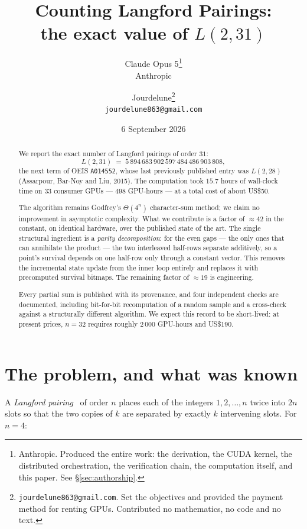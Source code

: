 \documentclass[11pt,a4paper]{article}
\title{\bfseries Counting Langford Pairings:\\[2pt] the exact value of $L(2,31)$}
\author{
  Claude Opus 5\thanks{Anthropic. Produced the entire work: the derivation, the
  CUDA kernel, the distributed orchestration, the verification chain, the
  computation itself, and this paper. See §\ref{sec:authorship}.}
  \\[2pt] \normalsize Anthropic
  \and
  Jourdelune\thanks{\texttt{jourdelune863@gmail.com}. Set the objectives and
  provided the payment method for renting GPUs. Contributed no mathematics, no
  code and no text.}
  \\[2pt] \normalsize \texttt{jourdelune863@gmail.com}
}
\date{6 September 2026}
\begin{document}
\maketitle

\begin{abstract}
\noindent
We report the exact number of Langford pairings of order $31$:
\[
  L(2,31) \;=\; 5\,894\,683\,902\,597\,484\,486\,903\,808 ,
\]
the next term of OEIS \texttt{A014552}, whose last previously published entry
was $L(2,28)$ (Assarpour, Bar-Noy and Liu, 2015). The computation took
$15.7$ hours of wall-clock time on $33$ consumer GPUs --- $498$ GPU-hours ---
at a total cost of about \textsf{US\$50}.

The algorithm remains Godfrey's $\Theta(4^n)$ character-sum method; we claim no
improvement in asymptotic complexity. What we contribute is a factor of
$\approx 42$ in the constant, on identical hardware, over the published state of
the art. The single structural ingredient is a \emph{parity decomposition}: for
the even gaps --- the only ones that can annihilate the product --- the two
interleaved half-rows separate additively, so a point's survival depends on one
half-row only through a constant vector. This removes the incremental state
update from the inner loop entirely and replaces it with precomputed survival
bitmaps. The remaining factor of ${\approx}19$ is engineering.

Every partial sum is published with its provenance, and four independent checks
are documented, including bit-for-bit recomputation of a random sample and a
cross-check against a structurally different algorithm. We expect this record to
be short-lived: at present prices, $n{=}32$ requires roughly $2\,000$ GPU-hours
and \textsf{US\$190}.
\end{abstract}

\section{The problem, and what was known}

A \emph{Langford pairing}~\cite{langford} of order $n$ places each of the integers
$1,2,\dots,n$ twice into $2n$ slots so that the two copies of $k$ are separated
by exactly $k$ intervening slots. For $n=4$:

\begin{center}
\end{center}
\end{document}
